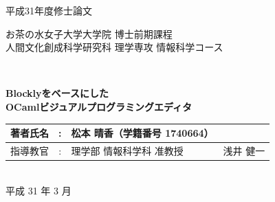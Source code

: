 
\begin{titlepage}
{\Large 平成31年度修士論文}\\

\setlength{\baselineskip}{13mm}
\parbox{\hsize}{
\vspace*{10mm}
\hspace*{\fill}
{\Large お茶の水女子大学大学院 博士前期課程
\vspace*{3mm}
\hspace*{\fill}\\\hspace*{\fill}
人間文化創成科学研究科 理学専攻 情報科学コース\hspace*{\fill}}}\\
\vspace*{8mm}

\begin{center}
  \textbf{
    \huge \textbf{Blocklyをベースにした\\OCamlビジュアルプログラミングエディタ}}
  \vspace*{20mm}
  
  \begin{figure}[h]
    \begin{center}
    \end{center}
  \end{figure}
  \vspace*{20mm}
  
  {\LARGE
    \begin{tabular}{@{}lcl@{\quad}l}
      著者氏名 & : & 松本 晴香（学籍番号 1740664）\\[-1mm] \hline
      指導教官 & : & 理学部 情報科学科 准教授  & 浅井 健一\\[-1mm] \hline
    \end{tabular}
  }\\
  \vspace*{18mm}
  {\LARGE 平成 31 年 3 月}
\end{center}

\end{titlepage}
